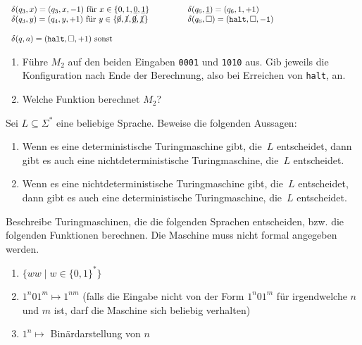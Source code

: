 \documentclass{uebung_cs}
\begin{document}
\begin{exercise}
\[\begin{tabular}{p{7.2cm}p{7.2cm}}
			$\delta(q_3,x) = (q_3,x,-1)$ für $x \in \{0,1,\underline{0},\underline{1}\}$                                     & $\delta(q_6,\underline{1}) = (q_6,1,+1)$                           \\
			$\delta(q_3,y) = (q_4,y,+1)$ für $y \in \{\cancel{0},\cancel{1},\underline{\cancel{0}},\underline{\cancel{1}}\}$ & $\delta(q_6,\square) = (\mathtt{halt,\square ,-1})$                \\
			                                                                                                                 &                                                                    \\
			$\delta(q,a) = (\mathtt{halt}, \square, +1)$ sonst                                                               &                                                                    \\
		\end{tabular}
	\]
	\begin{enumerate}
		\item\easy
		      Führe $M_2$ auf den beiden Eingaben \texttt{0001} und \texttt{1010} aus. Gib jeweils die Konfiguration nach Ende der Berechnung, also bei Erreichen von \texttt{halt}, an.
		\item\mittel
		      Welche Funktion berechnet $M_2$?
	\end{enumerate}
\end{exercise}

\begin{exercise}[Nichtdeterminismus]
	Sei $L\subseteq\Sigma^\ast$ eine beliebige Sprache. Beweise die folgenden Aussagen:
	\begin{enumerate}
		\item\easy Wenn es eine deterministische Turingmaschine gibt, die~$L$ entscheidet, dann gibt es auch eine nichtdeterministische Turingmaschine, die~$L$ entscheidet.
		\item\hard Wenn es eine nichtdeterministische Turingmaschine gibt, die~$L$ entscheidet, dann gibt es auch eine deterministische Turingmaschine, die~$L$ entscheidet.
	\end{enumerate}
\end{exercise}
\begin{exercise}
	Beschreibe Turingmaschinen, die die folgenden Sprachen entscheiden, bzw. die folgenden Funktionen berechnen. Die Maschine muss nicht formal angegeben werden.
	\begin{enumerate}
		\item $\{ww \;|\; w \in \{0,1\}^*\}$
		\item $1^n 0 1^m \mapsto 1^{nm}$ (falls die Eingabe nicht von der Form $1^n 0 1^m$ für irgendwelche $n$ und $m$ ist, darf die Maschine sich beliebig verhalten)
		\item $1^n \mapsto$ Binärdarstellung von $n$
	\end{enumerate}
\end{exercise}
\end{document}
